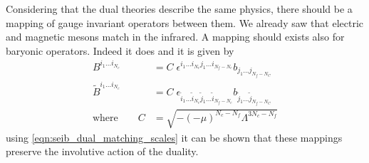 Considering that the dual theories describe the same physics, there should be a mapping of gauge invariant operators between them.
We already saw that electric and magnetic mesons match in the infrared. 
A mapping should exists also for baryonic operators. Indeed it does and it is given by
\begin{equation}
\begin{aligned}
 B^{i_1 \dots i_{N_c}} & = C \; \epsilon^{i_1 \dots i_{N_c} j_1 \dots i_{N_f - N_c}} b_{j_1 \dots j_{N_f - N_C}}\\
 \tilde{B}^{i_1 \dots i_{N_c}} &= C \; \epsilon_{\tilde{i}_1 \dots \tilde{i}_{N_c} \tilde{j}_1 \dots \tilde{i}_{N_f - N_c}} b_{ \tilde{j}_1 \dots \tilde{j}_{N_f - N_C}}\\
 \text{where} \qquad C & = \sqrt{ - (-\mu)^{N_c - N_f} \Lambda^{3 N_c - N_f}}
\end{aligned}
\end{equation}
using \eqref{eqn:seib_dual_matching_scales} it can be shown that these mappings preserve the involutive action of the duality. 

